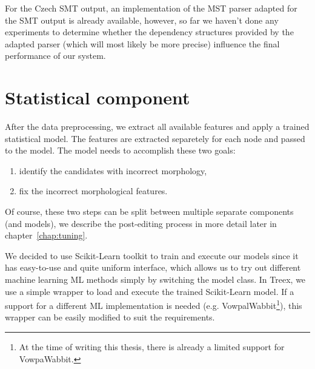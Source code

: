 For the Czech SMT output, an implementation of the MST parser adapted for the SMT output
is already available\cite{biblio:RoDuUsingParallel2012}, however, so far we haven't done any experiments
to determine whether the dependency structures provided by the adapted parser (which
will most likely be more precise) influence the final performance of our system.



\section{Statistical component}

After the data preprocessing, we extract all available features and
apply a trained statistical model. The features are extracted separetely for each node and passed
to the model. The model needs to accomplish these two goals:
\begin{enumerate}
    \item identify the candidates with incorrect morphology,
    \item fix the incorrect morphological features.
\end{enumerate}
Of course, these two steps can be split between multiple separate components (and models),
we describe the post-editing process in more detail later in chapter~\ref{chap:tuning}.

We decided to use Scikit-Learn\cite{scikit-learn} toolkit to train and execute our models since
it has easy-to-use and quite uniform interface, which allows us to try out different
machine learning ML methods simply by switching the model class. In Treex, we use a simple
wrapper to load and execute the trained Scikit-Learn model. If a support for a different ML implementation
is needed (e.g. VowpalWabbit\footnote{At the time of writing this thesis, there is already
a limited support for VowpaWabbit.}), this wrapper can be easily modified to suit the requirements.

